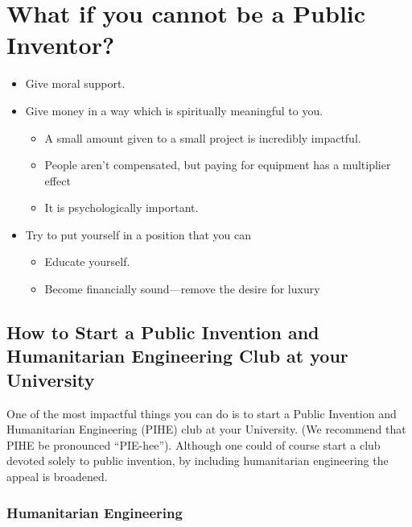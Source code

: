 \documentclass[
	fontsize=10pt, %
	twoside=false, %
	secnumdepth=1, %
]{kaobook}
\begin{document}
\chapter{What if you cannot be a Public Inventor?}

\begin{itemize}
\item Give moral support.
\item
  Give money in a way which is spiritually meaningful to you.
  \begin{itemize}
  \item A small amount given to a small project is incredibly impactful.
  \item People aren’t compensated, but paying for equipment has a multiplier effect
  \item It is psychologically important.
  \end{itemize}
\item Try to put yourself in a position that you can
  \begin{itemize}
  \item Educate yourself.
  \item Become financially sound---remove the desire for luxury
  \end{itemize}
\end{itemize}

\section{How to Start a Public Invention and Humanitarian Engineering Club at your University}

\label{sec:piheclub}


One of the most impactful things you can do is to start a Public Invention and Humanitarian Engineering (PIHE) club at your University. (We recommend that PIHE be pronounced “PIE-hee”). Although one could of course start a club devoted
solely to public invention, by including humanitarian engineering the appeal is broadened.



\subsection{Humanitarian Engineering}
\end{document}
